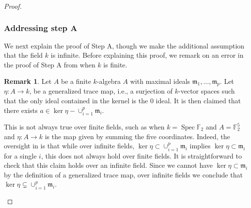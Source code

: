 \documentclass[12 pt]{amsart}
\theoremstyle{plain}
\theoremstyle{definition}
\newtheorem{remark}[theorem]{Remark}
\theoremstyle{remark}
\numberwithin{equation}{section}
\DeclareMathOperator\spec{\operatorname{Spec}}
\begin{document}
\begin{proof}
\subsubsection*{Addressing step A}
We next explain the proof of Step A, though we make the additional assumption
that the field $k$ is
infinite.
Before explaining this proof, we remark on an error in the proof of Step A from
\cite[Step A, p. 443]{casnatiE:covers-algebraic-varieties} when $k$ is finite.
\begin{remark}
	\label{remark:}
	Let $A$ be a finite $k$-algebra $A$ with maximal
	ideals $\mathfrak m_1, \ldots, \mathfrak m_p$. 
	Let $\eta: A \to k$, be a generalized trace map, i.e., a surjection of $k$-vector spaces
	such that the only ideal contained in the kernel is the $0$ ideal. 
	It is then claimed 
 that
there exists
  $a \in \ker \eta -
	\cup_{i=1}^p \mathfrak m_i$.  

	This is 
    not always true over finite fields, such as when $k= \spec \mathbb F_2$ and $A = \mathbb F_2^5$ and
	$\eta : A \to k$ is the map given by summing the five coordinates.
	Indeed, the oversight in \cite[Step A, p.
	443]{casnatiE:covers-algebraic-varieties} is that while
	over infinite fields, $\ker \eta \subset \cup_{i=1}^p
	\mathfrak m_i$ implies $\ker \eta \subset \mathfrak m_i$ for a single
	$i$,  this does not always hold over finite fields.  It is straightforward 
 to check that
 this claim holds over an infinite field.
	Since we cannot have $\ker \eta \subset \mathfrak m_i$ by the definition of a
	generalized trace map, over infinite fields we conclude that $\ker \eta
	\subsetneq \cup_{i=1}^p
	\mathfrak m_i$.
\end{remark}


\end{proof}
\end{document}

